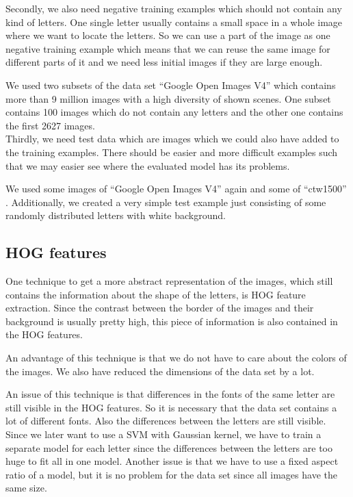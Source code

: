 \documentclass[conference]{IEEEtran}
\begin{document}
Secondly, we also need negative training examples which should not contain any kind of letters. One single letter usually contains a small space in a whole image where we want to locate the letters. So we can use a part of the image as one negative training example which means that we can reuse the same image for different parts of it and we need less initial images if they are large enough.

We used two subsets of the data set ``Google Open Images V4'' \cite{bib:openImg} which contains more than 9 million images with a high diversity of shown scenes. One subset contains 100 images which do not contain any letters and the other one contains the first 2627 images. \\[-5pt]

Thirdly, we need test data which are images which we could also have added to the training examples. There should be easier and more difficult examples such that we may easier see where the evaluated model has its problems.

We used some images of ``Google Open Images V4'' \cite{bib:openImg} again and some of ``ctw1500'' \cite{bib:ctw}. Additionally, we created a very simple test example just consisting of some randomly distributed letters with white background.

\subsection{HOG features}

One technique to get a more abstract representation of the images, which still contains the information about the shape of the letters, is HOG feature extraction. Since the contrast between the border of the images and their background is usually pretty high, this piece of information is also contained in the HOG features.

An advantage of this technique is that we do not have to care about the colors of the images. We also have reduced the dimensions of the data set by a lot.

An issue of this technique is that differences in the fonts of the same letter are still visible in the HOG features. So it is necessary that the data set \cite{bib:chars74k} contains a lot of different fonts. Also the differences between the letters are still visible. Since we later want to use a SVM with Gaussian kernel, we have to train a separate model for each letter since the differences  between the letters are too huge to fit all in one model. Another issue is that we have to use a fixed aspect ratio of a model, but it is no problem for the data set \cite{bib:chars74k} since all images have the same size.
\end{document}
